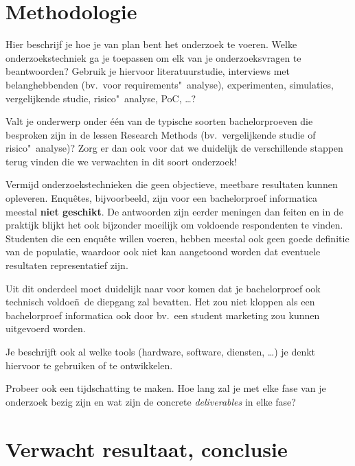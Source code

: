 \section{Methodologie}%
\label{sec:methodologie}

Hier beschrijf je hoe je van plan bent het onderzoek te voeren. Welke onderzoekstechniek ga je toepassen om elk van je onderzoeksvragen te beantwoorden? Gebruik je hiervoor literatuurstudie, interviews met belanghebbenden (bv.~voor requirements"~analyse), experimenten, simulaties, vergelijkende studie, risico"~analyse, PoC, \ldots?

Valt je onderwerp onder één van de typische soorten bachelorproeven die besproken zijn in de lessen Research Methods (bv.\ vergelijkende studie of risico"~analyse)? Zorg er dan ook voor dat we duidelijk de verschillende stappen terug vinden die we verwachten in dit soort onderzoek!

Vermijd onderzoekstechnieken die geen objectieve, meetbare resultaten kunnen opleveren. Enquêtes, bijvoorbeeld, zijn voor een bachelorproef informatica meestal \textbf{niet geschikt}. De antwoorden zijn eerder meningen dan feiten en in de praktijk blijkt het ook bijzonder moeilijk om voldoende respondenten te vinden. Studenten die een enquête willen voeren, hebben meestal ook geen goede definitie van de populatie, waardoor ook niet kan aangetoond worden dat eventuele resultaten representatief zijn.

Uit dit onderdeel moet duidelijk naar voor komen dat je bachelorproef ook technisch voldoen\"~de diepgang zal bevatten. Het zou niet kloppen als een bachelorproef informatica ook door bv.\ een student marketing zou kunnen uitgevoerd worden.

Je beschrijft ook al welke tools (hardware, software, diensten, \ldots) je denkt hiervoor te gebruiken of te ontwikkelen.

Probeer ook een tijdschatting te maken. Hoe lang zal je met elke fase van je onderzoek bezig zijn en wat zijn de concrete \emph{deliverables} in elke fase?

\section{Verwacht resultaat, conclusie}%
\label{sec:verwachte_resultaten}

